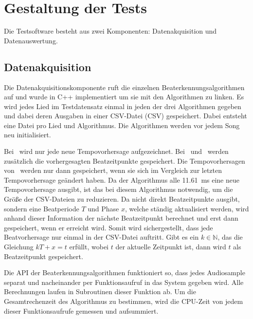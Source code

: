 \section{Gestaltung der Tests} \label{konzept/gestaltung}
{
	Die Testsoftware besteht aus zwei Komponenten:
		Datenakquisition und Datenauswertung.

	\subsection{Datenakquisition}
	{
		Die Datenakquisitionskomponente ruft die einzelnen Beaterkennungsalgorithmen auf
			und wurde in C++ implementiert
			um sie mit den Algorithmen zu linken.
		Es wird jedes Lied im Testdatensatz einmal in jeden der drei Algorithmen gegeben
			und dabei deren Ausgaben in einer \acs{CSV}-Datei (\acl{CSV}) gespeichert.
		Dabei entsteht eine Datei pro Lied und Algorithmus.
		Die Algorithmen werden vor jedem Song neu initialisiert.

		Bei~\cite{2001_BeatThis} wird nur jede neue Tempovorhersage aufgezeichnet.
		Bei~\cite{2009_DaPlSt} und~\cite{2011_PlRoSt} werden zusätzlich die vorhergesagten Beatzeitpunkte gespeichert.
		Die Tempovorhersagen von~\cite{2011_PlRoSt} werden nur dann gespeichert,
			wenn sie sich im Vergleich zur letzten Tempovorhersage geändert haben.
		Da der Algorithmus alle \SI{11.61}{\milli\second} eine neue Tempovorhersage ausgibt,
			ist das bei diesem Algorithmus notwendig,
			um die Grö{\ss}e der \acs{CSV}-Dateien zu reduzieren.
		Da \cite{2011_PlRoSt} nicht direkt Beatzeitpunkte ausgibt,
			sondern eine Beatperiode $T$ und Phase $x$,
			welche ständig aktualisiert werden,
			wird anhand dieser Information der nächste Beatzeitpunkt berechnet
			und erst dann gespeichert,
			wenn er erreicht wird.
		Somit wird sichergestellt,
			dass jede Beatvorhersage nur einmal in der \acs{CSV}-Datei auftritt.
		Gibt es ein $k \in \mathbb{N}$, das die Gleichung $kT + x = t$ erfüllt,
			wobei $t$ der aktuelle Zeitpunkt ist,
			dann wird $t$ als Beatzeitpunkt gespeichert.

		Die \ac{API} der Beaterkennungsalgorithmen funktioniert so,
			dass jedes Audiosample separat und nacheinander per Funktionsaufruf in das System gegeben wird.
		Alle Berechnungen laufen in Subroutinen dieser Funktion ab.
		Um die Gesamtrechenzeit des Algorithmus zu bestimmen,
			wird die \acs{CPU}-Zeit von jedem dieser Funktionsaufrufe gemessen und aufsummiert.
	}

}
